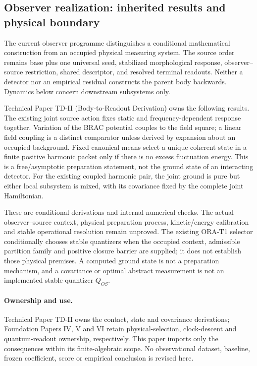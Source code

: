 \documentclass[11pt]{article}
\begin{document}
\subsection{Observer realization: inherited results and physical boundary}
\label{sec:observer-update-20260914}
The current observer programme distinguishes a conditional mathematical
construction from an occupied physical measuring system. The source order
remains base plus one universal seed, stabilized morphological response,
observer--source restriction, shared descriptor, and resolved terminal
readouts. Neither a detector nor an empirical residual constructs the parent
body backwards. Dynamics below concern downstream subsystems only.

Technical Paper TD-II (Body-to-Readout Derivation) owns the following
results. The existing joint source action fixes static and frequency-dependent
response together. Variation of the BRAC potential couples to the field
square; a linear field coupling is a distinct comparator unless derived by
expansion about an occupied background. Fixed canonical means select a unique
coherent state in a finite positive harmonic packet only if there is no excess
fluctuation energy. This is a free/asymptotic preparation statement, not the
ground state of an interacting detector. For the existing coupled harmonic
pair, the joint ground is pure but either local subsystem is mixed, with its
covariance fixed by the complete joint Hamiltonian.

These are conditional derivations and internal numerical checks. The actual
observer--source context, physical preparation process, kinetic/energy
calibration and stable operational resolution remain unproved. The existing
ORA-T1 selector conditionally chooses stable quantizers when the occupied
context, admissible partition family and positive closure barrier are supplied;
it does not establish those physical premises. A computed ground state is not
a preparation mechanism, and a covariance or optimal abstract measurement is
not an implemented stable quantizer $Q_{OS}$.

\paragraph{Ownership and use.}
Technical Paper TD-II owns the contact, state and covariance derivations;
Foundation Papers IV, V and VI retain physical-selection, clock-descent and
quantum-readout ownership, respectively. This paper imports only the
consequences within its finite-algebraic scope. No observational dataset,
baseline, frozen coefficient, score or empirical conclusion is revised here.
\end{document}
